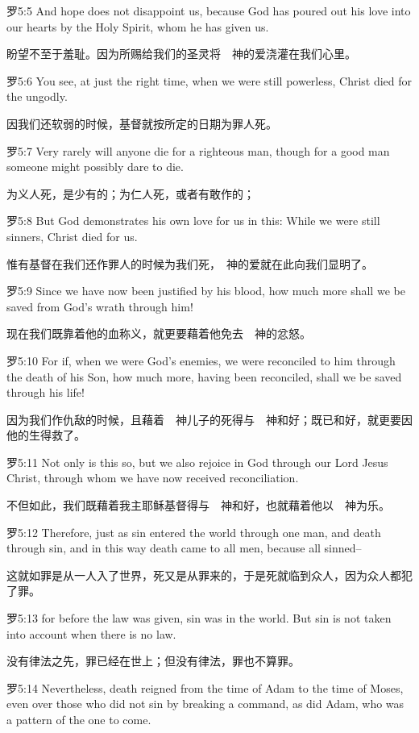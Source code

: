\documentclass[a4paper,11pt,onecolumn,twoside]{ctexart}
\begin{document}
\begin{multicols}{2}
 罗5:5
 And hope does not disappoint us, because God has poured out his love into our hearts by the Holy Spirit, whom he has given us.

 盼望不至于羞耻。因为所赐给我们的圣灵将　神的爱浇灌在我们心里。


 罗5:6
 You see, at just the right time, when we were still powerless, Christ died for the ungodly.

 因我们还软弱的时候，基督就按所定的日期为罪人死。


 罗5:7
 Very rarely will anyone die for a righteous man, though for a good man someone might possibly dare to die.

 为义人死，是少有的；为仁人死，或者有敢作的；


 罗5:8
 But God demonstrates his own love for us in this: While we were still sinners, Christ died for us.

 惟有基督在我们还作罪人的时候为我们死，　神的爱就在此向我们显明了。


 罗5:9
 Since we have now been justified by his blood, how much more shall we be saved from God's wrath through him!

 现在我们既靠着他的血称义，就更要藉着他免去　神的忿怒。


 罗5:10
 For if, when we were God's enemies, we were reconciled to him through the death of his Son, how much more, having been reconciled, shall we be saved through his life!

 因为我们作仇敌的时候，且藉着　神儿子的死得与　神和好；既已和好，就更要因他的生得救了。


 罗5:11
 Not only is this so, but we also rejoice in God through our Lord Jesus Christ, through whom we have now received reconciliation.

 不但如此，我们既藉着我主耶稣基督得与　神和好，也就藉着他以　神为乐。


 罗5:12
 Therefore, just as sin entered the world through one man, and death through sin, and in this way death came to all men, because all sinned--

 这就如罪是从一人入了世界，死又是从罪来的，于是死就临到众人，因为众人都犯了罪。


 罗5:13
 for before the law was given, sin was in the world. But sin is not taken into account when there is no law.

 没有律法之先，罪已经在世上；但没有律法，罪也不算罪。


 罗5:14
 Nevertheless, death reigned from the time of Adam to the time of Moses, even over those who did not sin by breaking a command, as did Adam, who was a pattern of the one to come.


\end{multicols}
\end{document}
